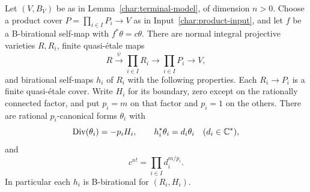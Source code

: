 \begin{lemma}
\label{char:factor-actions}
Let $(V,B_V)$ be as in Lemma~\ref{char:terminal-model}, of dimension
$n>0$.  Choose a product cover $P=\prod_{i\in I}P_i\to V$ as in
Input~\ref{char:product-input}, and let $f$ be a B-birational
self-map with $f^*\theta=c\theta$.  There are normal integral projective
varieties $R,R_i$, finite quasi-\'etale maps
\[
 R\xrightarrow{\ \psi\ }\prod_{i\in I}R_i
     \longrightarrow\prod_{i\in I}P_i\longrightarrow V,
\]
and birational self-maps $h_i$ of $R_i$ with the following properties.
Each $R_i\to P_i$ is a finite quasi-\'etale cover.  Write $H_i$ for
its boundary, zero except on the rationally connected factor, and
put $p_i=m$ on that factor and $p_i=1$ on the others.  There are
rational $p_i$-canonical forms $\theta_i$ with
\[
 \operatorname{Div}(\theta_i)=-p_iH_i,\qquad h_i^*\theta_i=d_i\theta_i
 \quad(d_i\in\mathbb C^*),
\]
and
\begin{equation}\label{char:scalar-product}
                       c^{n!}=\prod_{i\in I}d_i^{m/p_i}.
\end{equation}
In particular each $h_i$ is B-birational for $(R_i,H_i)$.
\end{lemma}

